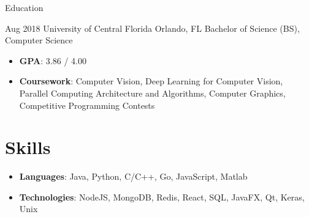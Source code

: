 \documentclass{resume}
\begin{document}
  \begin{fieldlist}{Education}

    \field
      {Aug 2018}
      {University of Central Florida}
      {Orlando, FL}
      {Bachelor of Science (BS), Computer Science}
      {
        \begin{itemize}
          \setlength\itemsep{0em}
          \item \textbf{GPA}: 3.86 / 4.00
          \item \textbf{Coursework}: Computer Vision, Deep Learning for Computer Vision, Parallel Computing Architecture and Algorithms, Computer Graphics, Competitive Programming Contests
        \end{itemize}
        
      }

  \end{fieldlist}
  \section{Skills}
      \begin{itemize}
        \item \textbf{Languages}: Java, Python, C/C++, Go, JavaScript, Matlab
        \item \textbf{Technologies}: NodeJS, MongoDB, Redis, React, SQL, JavaFX, Qt, Keras, Unix
      \end{itemize}
\end{document}
